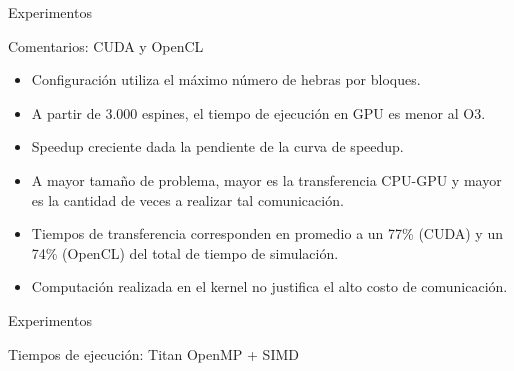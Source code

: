 \begin{frame}{Experimentos}
\begin{block}{Comentarios: CUDA y OpenCL}
\begin{itemize}
	  \item Configuración utiliza el máximo número de hebras por bloques.
	  \item A partir de 3.000 espines, el tiempo de ejecución en GPU es menor al O3.
	  \item Speedup creciente dada la pendiente de la curva de speedup.
	  \item A mayor tamaño de problema, mayor es la transferencia CPU-GPU y mayor es la cantidad de veces a realizar tal comunicación.
	  \item Tiempos de transferencia corresponden en promedio a un 77\% (CUDA) y un 74\% (OpenCL) del total de tiempo de simulación.
	  \item Computación realizada en el kernel no justifica el alto costo de comunicación.
	\end{itemize}
\end{block}
\end{frame}
\begin{frame}{Experimentos}
\begin{block}{Tiempos de ejecución: Titan OpenMP + SIMD}

\begin{columns}
  \begin{column}{.50\textwidth}
	\centerline{
      }
  \end{column}
  \begin{column}{.50\textwidth}
    \centerline{
      }
  \end{column}
\end{columns}
\end{block}
\end{frame}

